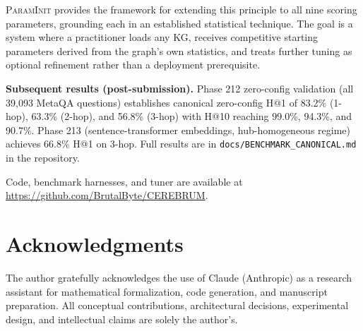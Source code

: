 \documentclass[10pt,twocolumn]{article}
\newcommand{\PI}{\textsc{ParamInit}}
\begin{document}
\PI{} provides the framework for extending this principle to all nine scoring
parameters, grounding each in an established statistical technique. The goal
is a system where a practitioner loads any KG, receives competitive starting
parameters derived from the graph's own statistics, and treats further tuning
as optional refinement rather than a deployment prerequisite.

\textbf{Subsequent results (post-submission).} Phase 212 zero-config validation
(all 39,093 MetaQA questions) establishes canonical zero-config H@1 of 83.2\%
(1-hop), 63.3\% (2-hop), and 56.8\% (3-hop) with H@10 reaching 99.0\%, 94.3\%,
and 90.7\%. Phase 213 (sentence-transformer embeddings, hub-homogeneous regime)
achieves 66.8\% H@1 on 3-hop. Full results are in
\texttt{docs/BENCHMARK\_CANONICAL.md} in the repository.

Code, benchmark harnesses, and tuner are available at
\url{https://github.com/BrutalByte/CEREBRUM}.

\section*{Acknowledgments}
The author gratefully acknowledges the use of Claude (Anthropic) as a research
assistant for mathematical formalization, code generation, and manuscript
preparation. All conceptual contributions, architectural decisions, experimental
design, and intellectual claims are solely the author's.
\end{document}
